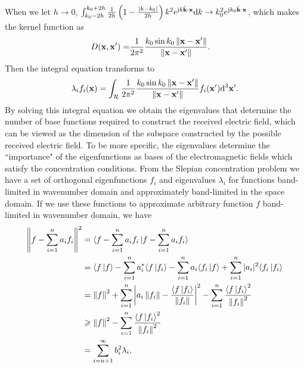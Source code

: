 \documentclass[12pt,draftclsnofoot,journal,onecolumn]{IEEEtran}
\begin{document}
    When we let $h\rightarrow 0$, $\int_{k_0-2h}^{k_0+2h} \frac{1}{2h}\left( 1-\frac{|k-k_0|}{2h} \right)k^2e^{{\rm j}k\hat{\bf k}\cdot {\bf x}}{\rm d}k \rightarrow k_0^2 e^{{\rm j}k_0 \hat{\bf k}\cdot {\bf x}}$, which makes the kernel function as 
    \begin{equation}
    	\begin{aligned}
    		D({\bf x},{\bf x}') =&  \frac{1}{2\pi^2} \frac{k_0\sin k_0 \left\| {\bf x}-{\bf x}' \right\|}{\left\|  {\bf x}-{\bf x}' \right\|}.
    	\end{aligned}
		\label{eqn_spherical_surface}
    \end{equation}
    Then the integral equation transforms to
    	\begin{equation}
    	\lambda_i f_i({\bf x}) = \int_{\mathcal{R}} \frac{1}{2\pi^2} \frac{k_0\sin k_0 \left\| {\bf x}-{\bf x}' \right\|}{\left\|  {\bf x}-{\bf x}' \right\|}f_i({\bf x}'){\rm d}^3{\bf x}'.
    	\label{equ_sphere_surface}
    \end{equation}
    By solving this integral equation we obtain the eigenvalues that determine the number of base functions required to construct the received electric field, which can be viewed as the dimension of the subspace constructed by the possible received electric field. To be more specific, the eigenvalues determine the {\color{red}``importance"} of the eigenfunctions as bases of the electromagnetic fields which satisfy the concentration conditions. From the Slepian concentration problem we have a set of orthogonal eigenfunctions $f_i$ and eigenvalues $\lambda_i$ for functions band-limited in wavenumber domain and approximately band-limited in the space domain. If we use these functions to approximate arbitrary function $f$ band-limited in wavenumber domain, we have 
		\begin{equation}
	\begin{aligned}
		\left\| f-\sum_{i=1}^n a_i f_i  \right\|^2 &= 
		\langle f-\sum_{i=1}^n a_i f_i \ket{f-\sum_{i=1}^n a_i f_i}
		\\& = \langle f \ket{f} - \sum_{i=1}^n a_i^* \langle f \ket{f_i} -\sum_{i=1}^n a_i \langle f_i \ket{f} + \sum_{i=1}^n |a_i|^2 \langle f_i \ket{f_i}
		\\& = \left\| f \right\|^2 + \sum_{i=1}^n \left| a_i \left\| f_i \right\| - \frac{ \langle f \ket{f_i}}{\left\| f_i \right\|} \right|^2 - \sum_{i=1}^n \frac{ \langle f \ket{f_i}^2}{\left\| f_i \right\|^2}
		\\&\geqslant  \left\| f \right\|^2 - \sum_{i=1}^n \frac{ \langle f \ket{f_i}^2}{\left\| f_i \right\|^2}
		\\&=\sum_{i=n+1}^{\infty} b_i^2 \lambda_i ,
	\end{aligned}
	\label{eqn_min_f_approx}
	\end{equation}
\end{document}
